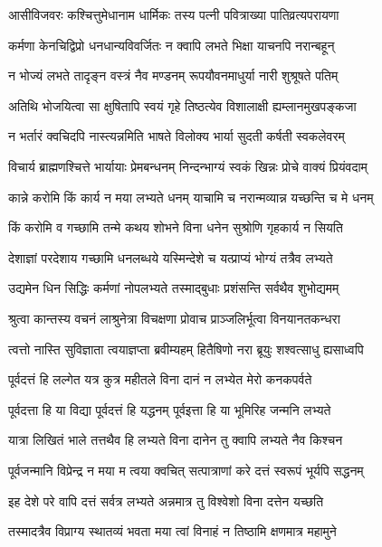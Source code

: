 \twolineshloka
{आसीविजवरः कश्चित्तुमेधानाम धार्मिकः}
{तस्य पत्नी पवित्राख्या पातिव्रत्यपरायणा} %

\twolineshloka
{कर्मणा केनचिद्विप्रो धनधान्यविवर्जितः}
{न क्वापि लभते भिक्षा याचनपि नरान्बहून्} %

\twolineshloka
{न भोज्यं लभते तादृङ्न वस्त्रं नैव मण्डनम्}
{रूपयौवनमाधुर्या नारी शुश्रूषते पतिम्} %

\twolineshloka
{अतिथि भोजयित्वा सा क्षुषितापि स्वयं गृहे}
{तिष्ठत्येव विशालाक्षी ह्यम्लानमुखपङ्कजा} %

\twolineshloka
{न भर्तारं क्वचिदपि नास्त्यन्नमिति भाषते}
{विलोक्य भार्या सुदती कर्षती स्वकलेवरम्} %

\twolineshloka
{विचार्य ब्राह्मणश्चित्ते भार्यायाः प्रेमबन्धनम्}
{निन्दन्भाग्यं स्वकं खिन्नः प्रोचे वाक्यं प्रियंवदाम्} %

\twolineshloka
{कान्ने करोमि किं कार्य न मया लभ्यते धनम्}
{याचामि च नरान्मव्यान्न यच्छन्ति च मे धनम्} %

\twolineshloka
{किं करोमि व गच्छामि तन्मे कथय शोभने}
{विना धनेन सुश्रोणि गृहकार्य न सियति} %

\twolineshloka
{देशाज्ञां परदेशाय गच्छामि धनलब्धये}
{यस्मिन्देशे च यत्प्राप्यं भोग्यं तत्रैव लभ्यते} %

\twolineshloka
{उद्यमेन धिन सिद्धिः कर्मणां नोपलभ्यते}
{तस्माद्बुधाः प्रशंसन्ति सर्वथैव शुभोद्यमम्} %

\twolineshloka
{श्रुत्वा कान्तस्य वचनं लाश्रुनेत्रा विचक्षणा}
{प्रोवाच प्राञ्जलिर्भूत्वा विनयानतकन्धरा} %

\twolineshloka
{त्वत्तो नास्ति सुविज्ञाता त्वयाज्ञप्ता ब्रवीम्यहम्}
{हितैषिणो नरा ब्रूयुः शश्वत्साधु ह्यसाध्वपि} %

\twolineshloka
{पूर्वदत्तं हि लल्गेत यत्र कुत्र महीतले}
{विना दानं न लभ्येत मेरो कनकपर्वते} %

\twolineshloka
{पूर्वदत्ता हि या विद्या पूर्वदत्तं हि यद्धनम्}
{पूर्वइत्ता हि या भूमिरिह जन्मनि लभ्यते} %

\twolineshloka
{यात्रा लिखितं भाले तत्तथैव हि लभ्यते}
{विना दानेन तु क्वापि लभ्यते नैव किश्चन} %

\twolineshloka
{पूर्वजन्मानि विप्रेन्द्र न मया म त्वया क्वचित्}
{सत्पात्राणां करे दत्तं स्वरूपं भूर्यपि सद्धनम्} %

\twolineshloka
{इह देशे परे वापि दत्तं सर्वत्र लभ्यते}
{अन्नमात्र तु विश्वेशो विना दत्तेन यच्छति} %

\twolineshloka
{तस्मादत्रैव विप्राग्य स्थातव्यं भवता मया}
{त्वां विनाहं न तिष्ठामि क्षणमात्र महामुने} %

